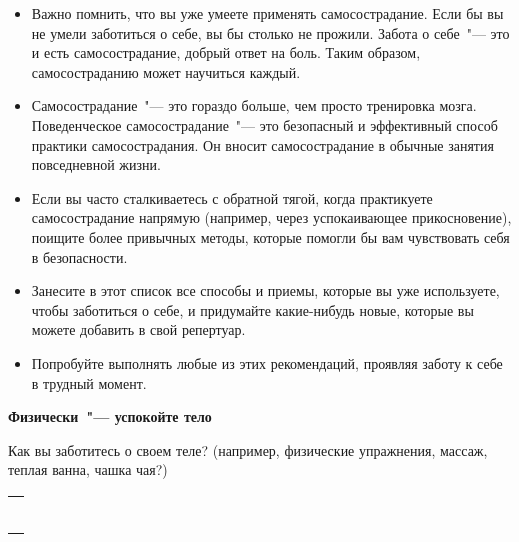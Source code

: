 \newpage
{}\label{IP:Self-Compassion_in_Daily_Life}
\begin{itemize}
	\item Важно помнить, что вы уже умеете применять самосострадание. Если бы вы не умели заботиться о себе, вы бы столько не прожили. Забота о себе~"--- это и есть самосострадание, добрый ответ на боль. Таким образом, самосостраданию может научиться каждый.
	
	\item Самосострадание~"--- это гораздо больше, чем просто тренировка мозга. Поведенческое самосострадание~"--- это безопасный и эффективный способ практики самосострадания. Он вносит самосострадание в обычные занятия повседневной жизни.
	
	\item Если вы часто сталкиваетесь с обратной тягой, когда практикуете самосострадание напрямую (например, через успокаивающее прикосновение), поищите более привычных методы, которые помогли бы вам чувствовать себя в безопасности.
	
	\item Занесите в этот список все способы и приемы, которые вы уже используете, чтобы заботиться о себе, и придумайте какие-нибудь новые, которые вы можете добавить в свой репертуар.
	
	\item Попробуйте выполнять любые из этих рекомендаций, проявляя заботу к себе в трудный момент.  
\end{itemize}

\vspace{5ex}

{\large \textbf{Физически~"--- успокойте тело}}

\begin{itemize}
	\itemWritingHand Как вы заботитесь о своем теле? (например, физические упражнения, массаж, теплая ванна, чашка чая?)
\end{itemize}

\setlength{\extrarowheight}{2mm}
\begin{tabularx}{\textwidth}{X}
	\\
	\arrayrulecolor{gray}\hline\\
	\hline\\
	\hline\\
	\hline\\
	\hline\\
	\hline\\
	\hline\\
\end{tabularx}
\setlength{\extrarowheight}{0mm}

